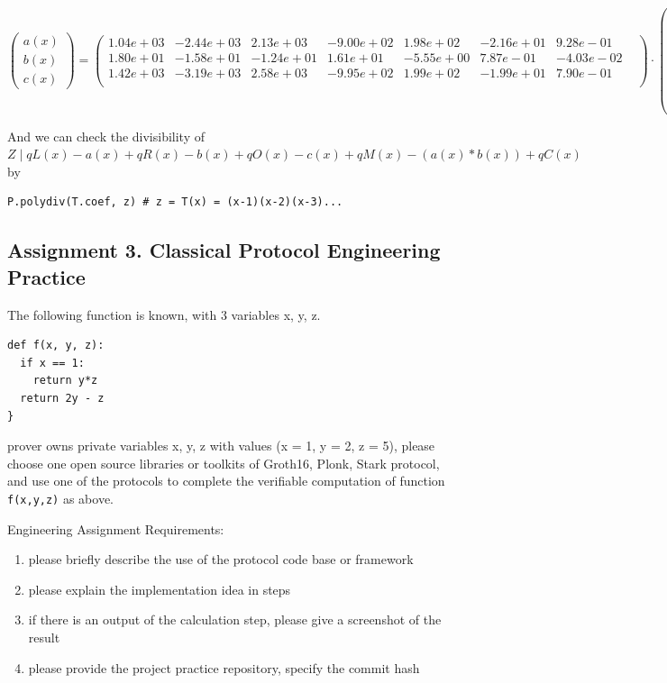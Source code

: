 \documentclass[11pt]{article}
\begin{document}
\(\begin{pmatrix} a(x)\\b(x)\\c(x) \end{pmatrix} = \begin{pmatrix} 1.04e+03 & -2.44e+03 & 2.13e+03 & -9.00e+02 & 1.98e+02 & -2.16e+01 & 9.28e-01 & \\ 1.80e+01 & -1.58e+01 & -1.24e+01 & 1.61e+01 & -5.55e+00 & 7.87e-01 & -4.03e-02 & \\ 1.42e+03 & -3.19e+03 & 2.58e+03 & -9.95e+02 & 1.99e+02 & -1.99e+01 & 7.90e-01 & \\ \end{pmatrix} \cdot \begin{pmatrix} 1\\x\\x^2\\x^3\\x^4\\x^5\\x^6 \end{pmatrix}\)

And we can check the divisibility of \(Z \mid qL(x) - a(x) + qR(x) - b(x) + qO(x) - c(x) + qM(x) - (a(x) * b(x)) + qC(x)\) by

\begin{verbatim}
P.polydiv(T.coef, z) # z = T(x) = (x-1)(x-2)(x-3)...
\end{verbatim}

\subsection{Assignment 3. Classical Protocol Engineering Practice}
\label{assignment-3.-classical-protocol-engineering-practice}
The following function is known, with 3 variables x, y, z.

\begin{verbatim}
def f(x, y, z):
  if x == 1:
    return y*z
  return 2y - z
}
\end{verbatim}

prover owns private variables x, y, z with values (x = 1, y = 2, z = 5), please choose one open source libraries or toolkits of Groth16, Plonk, Stark protocol, and use one of the protocols to complete the verifiable computation of function \texttt{f(x,y,z)} as above.

Engineering Assignment Requirements:

\begin{enumerate}
\item please briefly describe the use of the protocol code base or framework
\item please explain the implementation idea in steps
\item if there is an output of the calculation step, please give a screenshot of the result
\item please provide the project practice repository, specify the commit hash
\end{enumerate}
\end{document}
